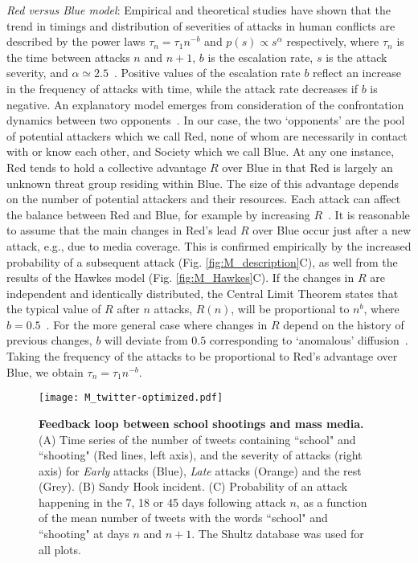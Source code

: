 \textit{Red versus Blue model}: 
Empirical and theoretical studies have
shown that the trend in timings and distribution of severities of
attacks in human conflicts are described by the power laws $\tau_n =
\tau_1 n^{-b}$ and $p(s) \propto s^\alpha$ respectively, where
$\tau_n$ is the time between attacks $n$ and $n+1$, $b$ is the
escalation rate, $s$ is the attack severity, and $\alpha \simeq
2.5$~\cite{Johnson2011a,Johnson2013b}.
Positive values of the escalation rate $b$ reflect an increase in the
frequency of attacks with time, while the attack rate decreases if $b$
is negative. 
An explanatory model emerges from consideration of the confrontation
dynamics between two opponents~\cite{Johnson2011a}. 
In our case, the two `opponents' are the pool of potential attackers
which we call Red, none of whom are necessarily in contact with or
know each other, and Society which we call Blue. 
At any one instance, Red tends to hold a collective advantage $R$ over
Blue in that Red is largely an unknown threat group residing within
Blue. 
The size of this advantage depends on the number of potential
attackers and their resources. Each attack can affect the balance
between Red and Blue, for example by increasing
$R$~\cite{Johnson2011a,Johnson2013b}. 
It is reasonable to assume that the main changes in Red's lead $R$
over Blue occur just after a new attack, e.g., due to media
coverage. This is confirmed empirically by the increased probability
of a subsequent attack (Fig. \ref{fig:M_description}C), as well from
the results of the Hawkes model (Fig. \ref{fig:M_Hawkes}C). 
If the changes in $R$ are independent and identically distributed, the
Central Limit Theorem states that the typical value of $R$ after $n$
attacks, $R(n)$, will be proportional to $n^b$, where $b =
0.5$~\cite{Rudnick2010}. For the more general case where changes in
$R$ depend on the history of previous changes, $b$ will deviate from
$0.5$ corresponding to `anomalous'
diffusion~\cite{Klafter1987}. Taking the frequency of the attacks to
be proportional to Red's advantage over Blue, we obtain $\tau_n =
\tau_1 n^{-b}$. 

\begin{figure*}[htp!]
  \centering
  \texttt{[image: M\_twitter-optimized.pdf]}
  \caption{
    \textbf{Feedback loop between school shootings and mass
      media.} 
    (A) Time series of the number of tweets containing ``school" and
    ``shooting" (Red lines, left axis), and the severity of attacks
    (right axis) for \textit{Early} attacks (Blue), \textit{Late}
    attacks (Orange) and the rest (Grey). 
    (B) Sandy Hook incident. 
    (C) Probability of an attack happening in the 7, 18 or 45 days
    following attack $n$, as a function of the mean number of tweets
    with the words ``school" and ``shooting" at days $n$ and
    ${n+1}$. The Shultz database was used for all
    plots.
  } 
  \label{fig:M_twitter}
\end{figure*}


